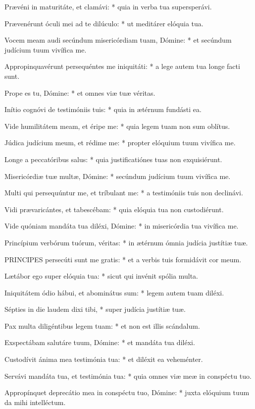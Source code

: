 Prævéni in maturitáte, et clamávi: * quia in verba tua supersperávi.

Prævenérunt óculi mei ad te dilúculo: * ut meditárer elóquia tua.

Vocem meam audi secúndum misericórdiam tuam, Dómine: * et secúndum judícium tuum vivífica me.

Appropinquavérunt persequéntes me iniquitáti: * a lege autem tua longe facti sunt.

Prope es tu, Dómine: * et omnes viæ tuæ véritas.

Inítio cognóvi de testimóniis tuis: * quia in ætérnum fundásti ea.

Vide humilitátem meam, et éripe me: * quia legem tuam non sum oblítus.

Júdica judícium meum, et rédime me: * propter elóquium tuum vivífica me.

Longe a peccatóribus salus: * quia justificatiónes tuas non exquisiérunt.

Misericórdiæ tuæ multæ, Dómine: * secúndum judícium tuum vivífica me.

Multi qui persequúntur me, et tríbulant me: * a testimóniis tuis non declinávi.

Vidi prævaricántes, et tabescébam: * quia elóquia tua non custodiérunt.

Vide quóniam mandáta tua diléxi, Dómine: * in misericórdia tua vivífica me.

Princípium verbórum tuórum, véritas: * in ætérnum ómnia judícia justítiæ tuæ.


\lettrine[lines=2]{P}{RINCIPES} persecúti sunt me gratis: * et a verbis tuis formidávit cor meum.

Lætábor ego super elóquia tua: * sicut qui invénit spólia multa.

Iniquitátem ódio hábui, et abominátus sum: * legem autem tuam diléxi.

Sépties in die laudem dixi tibi, * super judícia justítiæ tuæ.

Pax multa diligéntibus legem tuam: * et non est illis scándalum.

Exspectábam salutáre tuum, Dómine: * et mandáta tua diléxi.

Custodívit ánima mea testimónia tua: * et diléxit ea veheménter.

Servávi mandáta tua, et testimónia tua: * quia omnes viæ meæ in conspéctu tuo.

Appropínquet deprecátio mea in conspéctu tuo, Dómine: * juxta elóquium tuum da mihi intelléctum.

